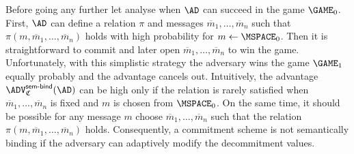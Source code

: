 \documentclass{crypto-exercise}
\newcommand{\CS}{\mathfrak{C}}
\newcommand{\advSEMBINDXX}[2]{\ADV_{#1}^{\mathsf{sem\text{-}bind}}(#2)}
\begin{document}
\begin{solution}
Before going any further let analyse when $\AD$ can succeed in the game $\GAME_0$. First, $\AD$ can define a relation $\pi$ and messages $\overline{m}_1,\ldots, \overline{m}_n$ such that $\pi(m,\overline{m}_1,\ldots, \overline{m}_n)$ holds with high probability for $m\gets\MSPACE_0$. Then it is straightforward to commit and later open $\overline{m}_1,\ldots, \overline{m}_n$ to win the game. Unfortunately, with this simplistic strategy the adversary wins the game $\GAME_1$ equally probably and the advantage cancels out. Intuitively, the advantage $\advSEMBINDXX{\CS}{\AD}$ can be high only if the relation is rarely satisfied when $\overline{m}_1,\ldots, \overline{m}_n$ is fixed and $m$ is chosen from $\MSPACE_0$. On the same time, it should be possible for any message $m$ choose $\overline{m}_1,\ldots,\overline{m}_n$ such that the relation $\pi(m,\overline{m}_1,\ldots, \overline{m}_n)$ holds. Consequently, a commitment scheme is not semantically binding if the adversary can adaptively modify the decommitment values.   


\end{solution}
\end{document}
